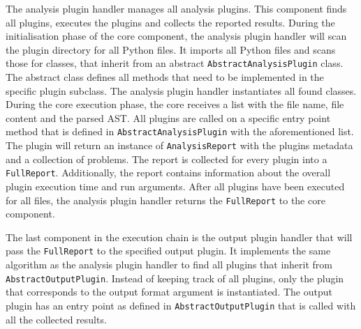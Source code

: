 The analysis plugin handler manages all analysis plugins. This component finds all plugins, executes the plugins and collects the reported results.
During the initialisation phase of the core component, the analysis plugin handler will scan the plugin directory for all Python files. It imports all Python files and scans those for classes, that inherit from an abstract \texttt{AbstractAnalysisPlugin} class. The abstract class defines all methods that need to be implemented in the specific plugin subclass. The analysis plugin handler instantiates all found classes.
During the core execution phase, the core receives a list with the file name, file content and the parsed AST. All plugins are called on a specific entry point method that is defined in \texttt{AbstractAnalysisPlugin} with the aforementioned list. The plugin will return an instance of \texttt{AnalysisReport} with the plugins metadata and a collection of problems. The report is collected for every plugin into a \texttt{FullReport}. Additionally, the report contains information about the overall plugin execution time and run arguments. After all plugins have been executed for all files, the analysis plugin handler returns the \texttt{FullReport} to the core component.

The last component in the execution chain is the output plugin handler that will pass the \texttt{FullReport} to the specified output plugin. It implements the same algorithm as the analysis plugin handler to find all plugins that inherit from \texttt{AbstractOutputPlugin}. Instead of keeping track of all plugins, only the plugin that corresponds to the output format argument is instantiated. The output plugin has an entry point as defined in \texttt{AbstractOutputPlugin}  that is called with all the collected results.

